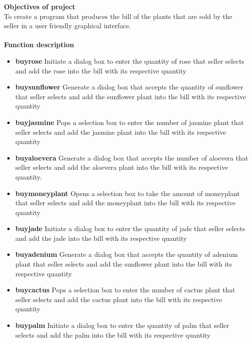 \documentclass[11pt,a4paper]{article}
\begin{document}
\pagestyle{fancy}
\fancyfoot{}
\fancyfoot[R]{{\small\thepage}}
\renewcommand{\footrulewidth}{0.4pt}


\begin{flushleft}
	\textbf{\Large Objectives of project}\\
	To create a program that produces the bill of the plants that are sold by the seller in a user friendly graphical interface.\\


	\textbf{\Large \\ Function description}
	
	\begin{itemize}
	
	
	\item \textbf{buyrose} Initiate a dialog box to enter the quantity of rose that seller selects and add the rose into the bill with its respective quantity\\
	\item \textbf{buysunflower} Generate a dialog box that accepts the quantity of sunflower that seller selects and add the sunflower plant into the bill with its respective quantity\\
	\item \textbf{buyjasmine} Pops a selection box to enter the number of jasmine plant that seller selects and add the jasmine plant into the bill with its respective quantity\\
	\item \textbf{buyaloevera} Generate a dialog box that accepts the number of aloevera that seller selects and add the aloevera plant into the bill with its respective quantity.
	\item \textbf{buymoneyplant} Opens a selection box to take the amount of moneyplant that seller selects and add the moneyplant into the bill with its respective quantity\\
	\item \textbf{buyjade} Initiate a dialog box to enter the quantity of jade that seller selects and add the jade into the bill with its respective quantity\\
	
	\item \textbf{buyadenium} Generate a dialog box that accepts the quantity of adenium plant that seller selects and add the sunflower plant into the bill with its respective quantity\\
	\item \textbf{buycactus} Pops a selection box to enter the number of cactus plant that seller selects and add the cactus plant into the bill with its respective quantity\\
	\item \textbf{buypalm} Initiate a dialog box to enter the quantity of palm that seller selects and add the palm into the bill with its respective quantity\\
	

\end{itemize}
\end{flushleft}
\end{document}
